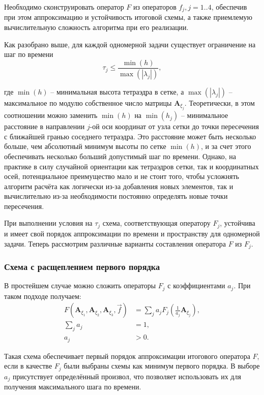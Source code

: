 Необходимо сконструировать оператор $F$ из операторов $f_j, j=1..4$, обеспечив при этом аппроксимацию и устойчивость итоговой схемы, а также приемлемую вычислительную сложность алгоритма при его реализации.

Как разобрано выше, для каждой одномерной задачи существует ограничение на шаг по времени
\begin{equation}
\tau_j \le \frac{\min(h)}{\max(|\lambda_j|)},
\end{equation}

где $\min(h)$ -- минимальная высота тетраэдра в сетке, а $\max(|\lambda_j|)$ -- максимальное по модулю собственное число матрицы $\mathbf A_{\xi_j}$. Теоретически, в этом соотношении можно заменить $\min(h)$ на $\min(h_j)$ -- минимальное расстояние в направлении $j$-ой оси координат от узла сетки до точки пересечения с ближайшей гранью соседнего тетраэдра. Это расстояние может быть несколько больше, чем абсолютный минимум высоты по сетке $\min(h)$, и за счет этого обеспечивать несколько больший допустимый шаг по времени. Однако, на практике в силу случайной ориентации как тетраэдров сетки, так и координатных осей, потенциальное преимущество мало и не стоит того, чтобы усложнять алгоритм расчёта как логически из-за добавления новых элементов, так и вычислительно из-за необходимости постоянно определять новые точки пересечения.

При выполнении условия на $\tau_j$ схема, соответствующая оператору $F_j$, устойчива и имеет свой порядок аппроксимации по времени и пространству для одномерной задачи. Теперь рассмотрим различные варианты составления оператора $F$ из $F_j$.


\subsubsection{Схема с расщеплением первого порядка}

В простейшем случае можно сложить операторы $F_j$ с коэффициентами $a_j$. При таком подходе получаем:
\begin{align}
F(\mathbf A_{\xi_1}, \mathbf A_{\xi_2}, \mathbf A_{\xi_3}, \vec f) &= \sum\limits_{j} a_j F_j(\frac{1}{a_j} \mathbf A_{\xi_j}), \nonumber\\
\sum\limits_{j} a_j &= 1, \nonumber\\
a_j &> 0.
\end{align}

Такая схема обеспечивает первый порядок аппроксимации итогового оператора $F$, если в качестве $F_j$ были выбраны схемы как минимум первого порядка. В выборе $a_j$ присутствует определённый произвол, что позволяет использовать их для получения максимального шага по времени.

